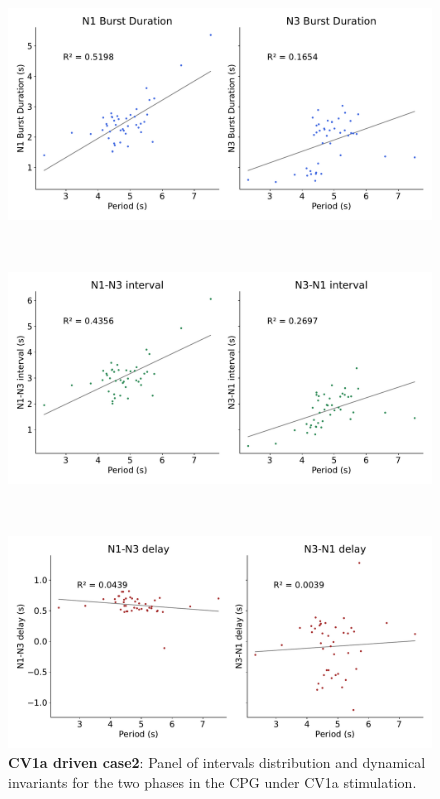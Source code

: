 \begin{figure}[htbp]
\begin{minipage}{0.9\textwidth}
\begin{minipage}[b]{0.55\textwidth}
			\centering
			\begin{minipage}[b]{\textwidth}
				\centering
				\includegraphics[width=\textwidth]{./invariants/data/SUSSEX/CV1a_driven2/images/stim_cv1a2_durations.pdf}
			\end{minipage}\\
			\begin{minipage}[b]{\textwidth}
				\centering
				\includegraphics[width=\textwidth]{./invariants/data/SUSSEX/CV1a_driven2/images/stim_cv1a2_intervals.pdf}
			\end{minipage}\\
			\begin{minipage}[b]{\textwidth}
				\centering
				\includegraphics[width=\textwidth]{./invariants/data/SUSSEX/CV1a_driven2/images/stim_cv1a2_delays.pdf}
			\end{minipage}
		\end{minipage}
	\end{minipage}
	
	\caption{\textbf{CV1a driven case2}: Panel of intervals distribution and dynamical invariants for the two phases in the CPG under CV1a stimulation.}
	\label{fig:cv1a 2 2phases}
\end{figure}




